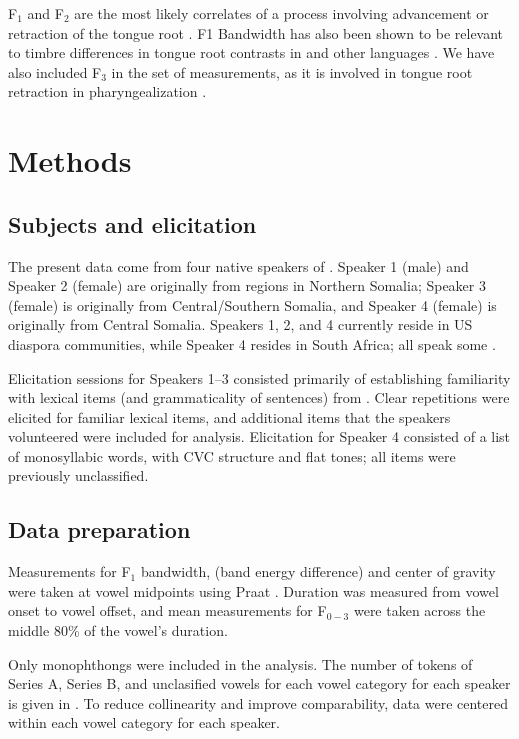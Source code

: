 \documentclass[output=paper
,newtxmath
,modfonts
,nonflat]{langsci/langscibook}
\begin{document}
F$_1$ and F$_2$ are the most likely correlates of a process involving advancement or retraction of the tongue root \citep{Starwalt2008}.  F1 Bandwidth has also been shown to be relevant to timbre differences in tongue root contrasts in  \citep{Hess1992} and other languages \citep{Starwalt2008}.  We have also included F$_3$ in the set of measurements, as it is involved in tongue root retraction in  pharyngealization \cite{Ghazeli1977}.

\section{Methods}
\label{methods}

\subsection{Subjects and elicitation}

The present data come from four native speakers of .  Speaker 1 (male) and Speaker 2 (female) are originally from regions in Northern Somalia; Speaker 3 (female) is originally from Central/Southern Somalia, and Speaker 4 (female) is originally from Central Somalia.  Speakers 1, 2, and 4 currently reside in US diaspora communities, while Speaker 4 resides in South Africa; all speak some .

Elicitation sessions for Speakers 1--3 consisted primarily of establishing familiarity with lexical items (and grammaticality of sentences) from \cite{Andrzejewski1955}.  Clear repetitions were elicited for familiar lexical items, and additional items that the speakers volunteered were included for analysis.  Elicitation for Speaker 4 consisted of a list of monosyllabic words, with CVC structure and flat tones; all items were previously unclassified.

\subsection{Data preparation}


Measurements for F$_1$ bandwidth,  (band energy difference) and center of gravity were taken at vowel midpoints using Praat \citep{praat}.  Duration was measured from vowel onset to vowel offset, and mean measurements for F$_{0-3}$ were taken across the middle 80\% of the vowel's duration.

Only monophthongs were included in the  analysis.  The number of tokens of Series A, Series B, and unclasified vowels for each vowel category for each speaker is given in .  To reduce collinearity and improve comparability, data were centered within each vowel category for each speaker.
\end{document}
